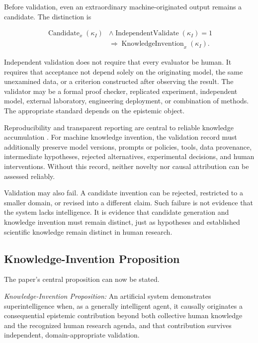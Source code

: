 Before validation, even an extraordinary machine-originated output remains a
candidate. The distinction is

\begin{equation}
\begin{aligned}
\operatorname{Candidate}_{x}(\kappa_I)
&\land
\operatorname{IndependentValidate}(\kappa_I)=1\\
&\Longrightarrow
\operatorname{KnowledgeInvention}_{x}(\kappa_I).
\end{aligned}
\label{eq:validation_boundary}
\end{equation}

Independent validation does not require that every evaluator be human. It
requires that acceptance not depend solely on the originating model, the same
unexamined data, or a criterion constructed after observing the result. The
validator may be a formal proof checker, replicated experiment, independent
model, external laboratory, engineering deployment, or combination of methods.
The appropriate standard depends on the epistemic object.

Reproducibility and transparent reporting are central to reliable knowledge
accumulation \cite{munafo2017reproducible}. For machine knowledge invention,
the validation record must additionally preserve model versions, prompts or
policies, tools, data provenance, intermediate hypotheses, rejected
alternatives, experimental decisions, and human interventions. Without this
record, neither novelty nor causal attribution can be assessed reliably.

Validation may also fail. A candidate invention can be rejected, restricted to
a smaller domain, or revised into a different claim. Such failure is not
evidence that the system lacks intelligence. It is evidence that candidate
generation and knowledge invention must remain distinct, just as hypotheses
and established scientific knowledge remain distinct in human research.

\subsection{\textbf{Knowledge-Invention Proposition}}

The paper's central proposition can now be stated.

\emph{Knowledge-Invention Proposition:} An artificial system demonstrates
superintelligence when, as a generally intelligent agent, it causally
originates a consequential epistemic contribution beyond both collective human
knowledge and the recognized human research agenda, and that contribution
survives independent, domain-appropriate validation.

